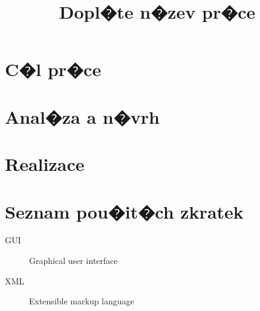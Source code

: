 \documentclass[thesis=B,czech]{FITthesis}[2012/06/26]
\title{Dopl�te n�zev pr�ce}
\begin{document}

\begin{introduction}
\end{introduction}

\chapter{C�l pr�ce}

\chapter{Anal�za a n�vrh}

\chapter{Realizace}

\begin{conclusion}
\end{conclusion}




\appendix

\chapter{Seznam pou�it�ch zkratek}
\begin{description}
	\item[GUI] Graphical user interface
	\item[XML] Extensible markup language
\end{description}
\end{document}
